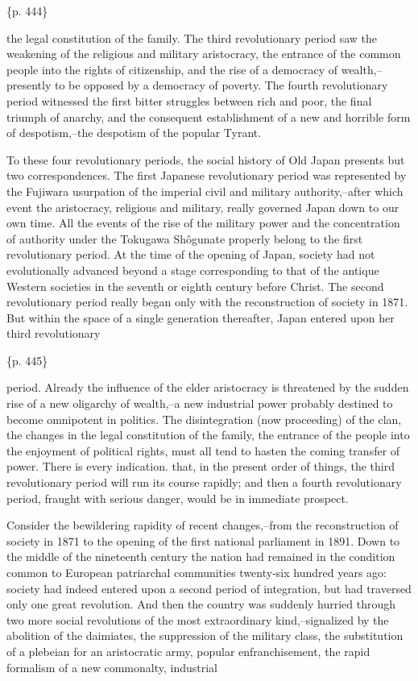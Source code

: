 \{p. 444\}

the legal constitution of the family. The third revolutionary period saw the weakening of the religious and military aristocracy, the entrance of the common people into the rights of citizenship, and the rise of a democracy of wealth,--presently to be opposed by a democracy of poverty. The fourth revolutionary period witnessed the first bitter struggles between rich and poor, the final triumph of anarchy, and the consequent establishment of a new and horrible form of despotism,--the despotism of the popular Tyrant.

To these four revolutionary periods, the social history of Old Japan presents but two correspondences. The first Japanese revolutionary period was represented by the Fujiwara usurpation of the imperial civil and military authority,--after which event the aristocracy, religious and military, really governed Japan down to our own time. All the events of the rise of the military power and the concentration of authority under the Tokugawa Shôgunate properly belong to the first revolutionary period. At the time of the opening of Japan, society had not evolutionally advanced beyond a stage corresponding to that of the antique Western societies in the seventh or eighth century before Christ. The second revolutionary period really began only with the reconstruction of society in 1871. But within the space of a single generation thereafter, Japan entered upon her third revolutionary

\{p. 445\}

period. Already the influence of the elder aristocracy is threatened by the sudden rise of a new oligarchy of wealth,--a new industrial power probably destined to become omnipotent in politics. The disintegration (now proceeding) of the clan, the changes in the legal constitution of the family, the entrance of the people into the enjoyment of political rights, must all tend to hasten the coming transfer of power. There is every indication. that, in the present order of things, the third revolutionary period will run its course rapidly; and then a fourth revolutionary period, fraught with serious danger, would be in immediate prospect.



Consider the bewildering rapidity of recent changes,--from the reconstruction of society in 1871 to the opening of the first national parliament in 1891. Down to the middle of the nineteenth century the nation had remained in the condition common to European patriarchal communities twenty-six hundred years ago: society had indeed entered upon a second period of integration, but had traversed only one great revolution. And then the country was suddenly hurried through two more social revolutions of the most extraordinary kind,--signalized by the abolition of the daimiates, the suppression of the military class, the substitution of a plebeian for an aristocratic army, popular enfranchisement, the rapid formalism of a new commonalty, industrial

